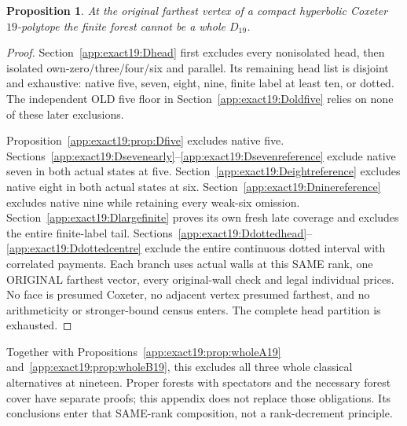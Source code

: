 \documentclass[11pt]{article}
\newtheorem{proposition}[theorem]{Proposition}
\theoremstyle{definition}
\theoremstyle{remark}
\begin{document}
\begin{proposition}\label{app:exact19:prop:wholeD19}
At the original farthest vertex of a compact hyperbolic Coxeter
\(19\)-polytope the finite forest cannot be a whole \(D_{19}\).
\end{proposition}
\begin{proof}
Section~\ref{app:exact19:Dhead} first excludes every nonisolated head,
then isolated own-zero/three/four/six and parallel.
Its remaining head list is disjoint and exhaustive: native five,
seven, eight, nine, finite label at least ten, or dotted.
The independent OLD five floor in
Section~\ref{app:exact19:Doldfive} relies on none of these later exclusions.

Proposition~\ref{app:exact19:prop:Dfive} excludes native five.
Sections~\ref{app:exact19:Dsevenearly}--\ref{app:exact19:Dsevenreference}
exclude native seven in both actual states at five.
Section~\ref{app:exact19:Deightreference} excludes native eight in both
actual states at six.
Section~\ref{app:exact19:Dninereference} excludes native nine while
retaining every weak-six omission.
Section~\ref{app:exact19:Dlargefinite} proves its own fresh late
coverage and excludes the entire finite-label tail.
Sections~\ref{app:exact19:Ddottedhead}--\ref{app:exact19:Ddottedcentre}
exclude the entire continuous dotted interval with correlated payments.
Each branch uses actual walls at this SAME rank, one ORIGINAL farthest
vector, every original-wall check and legal individual prices.
No face is presumed Coxeter, no adjacent vertex presumed farthest,
and no arithmeticity or stronger-bound census enters.
The complete head partition is exhausted.
\end{proof}

Together with Propositions~\ref{app:exact19:prop:wholeA19}
and~\ref{app:exact19:prop:wholeB19}, this excludes all three whole
classical alternatives at nineteen.
Proper forests with spectators and the necessary forest cover have
separate proofs; this appendix does not replace those obligations.
Its conclusions enter that SAME-rank composition, not a rank-decrement
principle.
\end{document}
